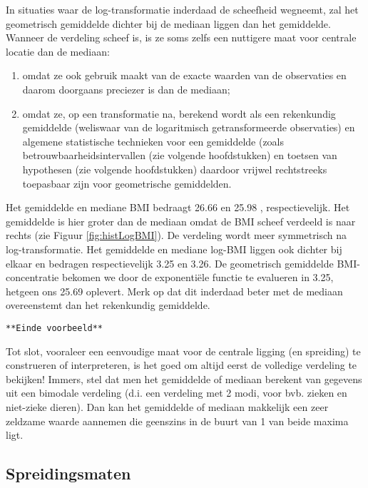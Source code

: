 \documentclass[12pt,dutch,coursenotes]{book}
\theoremstyle{definition}
\theoremstyle{definition}
\theoremstyle{definition}
\theoremstyle{remark}
\let\BeginKnitrBlock\begin \let\EndKnitrBlock\end
\begin{document}
In situaties waar de log-transformatie inderdaad de scheefheid wegneemt,
zal het geometrisch gemiddelde dichter bij de mediaan liggen dan het
gemiddelde. Wanneer de verdeling scheef is, is ze soms zelfs een
nuttigere maat voor centrale locatie dan de mediaan:

\begin{enumerate}
\def\labelenumi{\arabic{enumi}.}
\item
  omdat ze ook gebruik maakt van de exacte waarden van de observaties en
  daarom doorgaans preciezer is dan de mediaan;
\item
  omdat ze, op een transformatie na, berekend wordt als een rekenkundig
  gemiddelde (weliswaar van de logaritmisch getransformeerde
  observaties) en algemene statistische technieken voor een gemiddelde
  (zoals betrouwbaarheidsintervallen (zie volgende hoofdstukken) en
  toetsen van hypothesen (zie volgende hoofdstukken) daardoor vrijwel
  rechtstreeks toepasbaar zijn voor geometrische gemiddelden.
\end{enumerate}

\BeginKnitrBlock{example}[BMI]
\protect\hypertarget{exm:unnamed-chunk-44}{}{\label{exm:unnamed-chunk-44}
\iffalse (BMI) \fi{} }
\EndKnitrBlock{example} Het gemiddelde en mediane BMI bedraagt 26.66 en
25.98 , respectievelijk. Het gemiddelde is hier groter dan de mediaan
omdat de BMI scheef verdeeld is naar rechts (zie Figuur
\ref{fig:histLogBMI}). De verdeling wordt meer symmetrisch na
log-transformatie. Het gemiddelde en mediane log-BMI liggen ook dichter
bij elkaar en bedragen respectievelijk 3.25 en 3.26. De geometrisch
gemiddelde BMI-concentratie bekomen we door de exponentiële functie te
evalueren in 3.25, hetgeen ons 25.69 oplevert. Merk op dat dit inderdaad
beter met de mediaan overeenstemt dan het rekenkundig gemiddelde.

\texttt{**Einde\ voorbeeld**}

Tot slot, vooraleer een eenvoudige maat voor de centrale ligging (en
spreiding) te construeren of interpreteren, is het goed om altijd eerst
de volledige verdeling te bekijken! Immers, stel dat men het gemiddelde
of mediaan berekent van gegevens uit een bimodale verdeling (d.i. een
verdeling met 2 modi, voor bvb. zieken en niet-zieke dieren). Dan kan
het gemiddelde of mediaan makkelijk een zeer zeldzame waarde aannemen
die geenszins in de buurt van 1 van beide maxima ligt.

\subsection{Spreidingsmaten}\label{subsec:spreiding}
\end{document}
